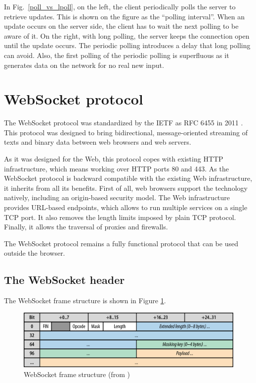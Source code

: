 \documentclass[10pt,journal,compsoc]{IEEEtran}
\newcommand{\ws}{WebSocket}
\begin{document}
In Fig.~\ref{poll_vs_lpoll}, on the left, the client periodically polls the server to retrieve updates. This is shown on the figure as the ``polling interval''. When an update occurs on the server side, the client has to wait the next polling to be aware of it. On the right, with long polling, the server keeps the connection open until the update occurs. The periodic polling introduces a delay that long polling can avoid. Also, the first polling of the periodic polling is superfluous as it generates data on the network for no real new input.

\section{\ws{} protocol}
\label{sec:ws}
The \ws{} protocol was standardized by the IETF as RFC 6455 in 2011 \cite{rfc6455}.
This protocol was designed to bring bidirectional, message-oriented streaming of texts and binary data between web browsers and web servers.

As it was designed for the Web, this protocol copes with existing HTTP infrastructure, which means working over HTTP ports 80 and 443.
As the \ws{} protocol is backward compatible with the existing Web infrastructure, it inherits from all its benefits.
First of all, web browsers support the technology natively, including an origin-based security model. %
The Web infrastructure provides URL-based endpoints, which allows to run multiple services on a single TCP port.
It also removes the length limits imposed by plain TCP protocol.
Finally, it allows the traversal of proxies and firewalls.

The \ws{} protocol remains a fully functional protocol that can be used outside the browser.

\subsection{The \ws{} header}
\label{sec:ws-header}
The \ws{} frame structure is shown in Figure \ref{fig:websocket_frame}.

\begin{figure}
    \centering
    \includegraphics[width=\linewidth]{websocket_frame.png}
    \caption{\ws{} frame structure (from \cite{HighPerfBrowserNetworking:websocket})}
    \label{fig:websocket_frame}
\end{figure}
\end{document}
